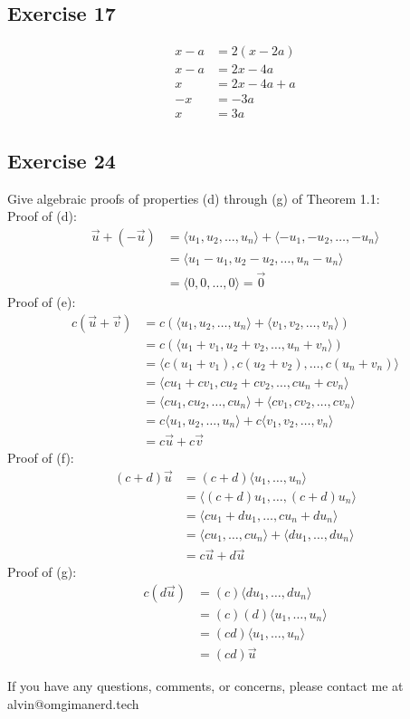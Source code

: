 \documentclass{math}
\begin{document}
\subsection*{Exercise 17}
\begin{align*}
  x-a &= 2(x-2a) \\
  x-a &= 2x-4a \\
  x &= 2x-4a+a \\
  -x &= -3a \\
  x &= 3a
\end{align*}

\subsection*{Exercise 24}
Give algebraic proofs of properties (d) through (g) of Theorem 1.1: \\
Proof of (d):
\begin{align*}
  \vec{u}+(-\vec{u}) &= \langle u_{1},u_{2},\dots,u_{n}\rangle+
    \langle-u_{1},-u_{2},\dots,-u_{n}\rangle \\
  &= \langle u_{1}-u_{1},u_{2}-u_{2},\dots,u_{n}-u_{n}\rangle \\
  &= \langle0,0,\dots,0\rangle = \vec{0}
\end{align*}
Proof of (e):
\begin{align*}
  c(\vec{u}+\vec{v}) &= c(\langle u_{1},u_{2},\dots,u_{n}\rangle+
    \langle v_{1},v_{2},\dots,v_{n}\rangle) \\
  &= c(\langle u_{1}+v_{1},u_{2}+v_{2},\dots,u_{n}+v_{n}\rangle) \\
  &= \langle c(u_{1}+v_{1}),c(u_{2}+v_{2}),\dots,c(u_{n}+v_{n})\rangle \\
  &= \langle cu_{1}+cv_{1},cu_{2}+cv_{2},\dots,cu_{n}+cv_{n}\rangle \\
  &= \langle cu_{1},cu_{2},\dots,cu_{n}\rangle+
    \langle cv_{1},cv_{2},\dots,cv_{n}\rangle \\
  &= c\langle u_{1},u_{2},\dots,u_{n}\rangle+
    c\langle v_{1},v_{2},\dots,v_{n}\rangle \\
  &= c\vec{u}+c\vec{v}
\end{align*}
Proof of (f):
\begin{align*}
  (c+d)\vec{u} &= (c+d)\langle u_{1},\dots,u_{n}\rangle \\
  &= \langle(c+d)u_{1},\dots,(c+d)u_{n}\rangle \\
  &= \langle cu_{1}+du_{1},\dots,cu_{n}+du_{n}\rangle \\
  &= \langle cu_{1},\dots,cu_{n}\rangle+\langle du_{1},\dots,du_{n}\rangle \\
  &= c\vec{u}+d\vec{u}
\end{align*}
Proof of (g):
\begin{align*}
  c(d\vec{u}) &= (c)\langle du_{1},\dots,du_{n}\rangle \\
  &= (c)(d)\langle u_{1},\dots,u_{n}\rangle \\
  &= (cd)\langle u_{1},\dots,u_{n}\rangle \\
  &= (cd)\vec{u}
\end{align*}

\begin{center}
  If you have any questions, comments, or concerns, please contact me at
  alvin@omgimanerd.tech
\end{center}
\end{document}
